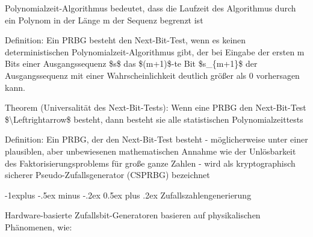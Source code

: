 \documentclass[a4paper]{article}
\makeatletter
\renewcommand{\subsection}{\@startsection{subsection}{2}{0mm}%
 {-1explus -.5ex minus -.2ex}%
 {0.5ex plus .2ex}%
 {\normalfont\normalsize\bfseries}}
\makeatother
\begin{document}
\begin{multicols}{3}
\begin{itemize*}
            \begin{itemize*}
                  \item Polynomialzeit-Algorithmus bedeutet, dass die Laufzeit des Algorithmus durch ein Polynom in der Länge m der Sequenz begrenzt ist
            \end{itemize*}
            \item
            Definition: Ein PRBG besteht den Next-Bit-Test, wenn es keinen
            deterministischen Polynomialzeit-Algorithmus gibt, der bei Eingabe der
            ersten m Bits einer Ausgangssequenz \$s\$ das \$(m+1)\$-te Bit
            \$s\_\{m+1\}\$ der Ausgangssequenz mit einer Wahrscheinlichkeit
            deutlich größer als 0 vorhersagen kann.
            \item
            Theorem (Universalität des Next-Bit-Tests): Wenn eine PRBG den
            Next-Bit-Test \$\textbackslash Leftrightarrow\$ besteht, dann besteht
            sie alle statistischen Polynomialzeittests
            \item
            Definition: Ein PRBG, der den Next-Bit-Test besteht - möglicherweise
            unter einer plausiblen, aber unbewiesenen mathematischen Annahme wie
            der Unlösbarkeit des Faktorisierungsproblems für große ganze Zahlen -
            wird als kryptographisch sicherer Pseudo-Zufallsgenerator (CSPRBG)
            bezeichnet
      \end{itemize*}


      \subsection{Zufallszahlengenerierung}

      \begin{itemize*}
            \item
            Hardware-basierte Zufallsbit-Generatoren basieren auf physikalischen
            Phänomenen, wie:


\end{itemize*}
\end{multicols}
\end{document}
